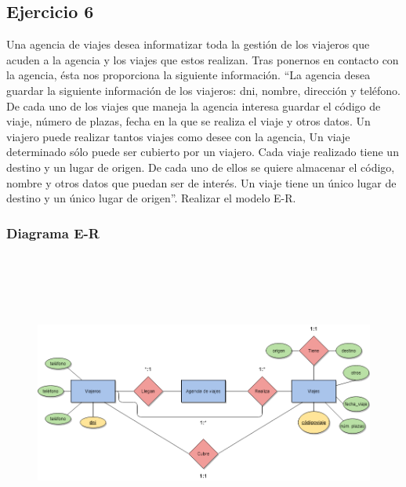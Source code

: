 \documentclass[a4paper, 12pt]{article}
\begin{document}
\begin{justify}
        \subsection{Ejercicio 6}
        \justify
        Una agencia de viajes desea informatizar toda la gestión de los viajeros que acuden a la agencia y los viajes que estos realizan. Tras ponernos en contacto con la agencia, ésta nos proporciona la siguiente información. ``La agencia 
        desea guardar la siguiente información de los viajeros: dni, nombre, dirección y teléfono. De cada uno de los viajes que maneja la agencia interesa guardar el código de viaje, número de plazas, fecha en la que se realiza el viaje y
        otros datos. Un viajero puede realizar tantos viajes como desee con la agencia, Un viaje determinado sólo puede ser cubierto por un viajero. Cada viaje realizado tiene un destino y un lugar de origen. De cada uno de ellos se quiere almacenar
        el código, nombre y otros datos que puedan ser de interés. Un viaje tiene un único lugar de destino y un único lugar de origen''. Realizar el modelo E-R.
        \subsubsection{Diagrama E-R}
        \begin{figure}[H]
            \centering
            \includegraphics[width=16cm,height=10cm]{er6.png}
        \end{figure}

\end{justify}
\end{document}
